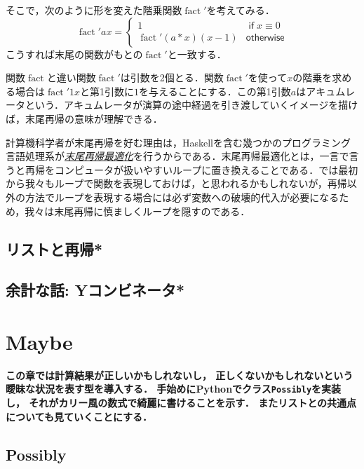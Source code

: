 \documentclass[a5paper,draft]{jsbook}
\newcommand{\programminglanguage}[1]{\textsf{#1}}
\newcommand{\haskell}{\programminglanguage{Haskell}}
\newcommand{\python}{\programminglanguage{Python}}
\newenvironment{leader}{\begingroup\bf}{\endgroup}
\newcommand{\keyword}[1]{{\underline{\emph{#1}}}}
\newcommand{\code}[1]{\texttt{#1}}
\newcommand{\mathSpecialFunction}[1]{\operatorname{\mathrm{#1}}}
\newcommand{\mathFactorial}{\mathSpecialFunction{fact}}
\newcommand{\mathKeyword}[1]{\operatorname{\textsf{#1}}}
\newcommand{\mathIf}{\mathKeyword{if}}
\newcommand{\mathOtherwise}{\mathKeyword{otherwise}}
\begin{document}
そこで，次のように形を変えた階乗関数$\mathFactorial'$を考えてみる．
\begin{equation}
\mathFactorial'ax=\begin{cases}
1&\mathIf x\equiv0\\
\mathFactorial'(a*x)(x-1)&\mathOtherwise
\end{cases}
\end{equation}
こうすれば末尾の関数がもとの$\mathFactorial'$と一致する．

関数$\mathFactorial$と違い関数$\mathFactorial'$は引数を2個とる．関数$\mathFactorial'$を使って$x$の階乗を求める場合は$\mathFactorial'1x$と第1引数に$1$を与えることにする．この第1引数$a$はアキュムレータという．アキュムレータが演算の途中経過を引き渡していくイメージを描けば，末尾再帰の意味が理解できる．

計算機科学者が末尾再帰を好む理由は，\haskell を含む幾つかのプログラミング言語処理系が\keyword{末尾再帰最適化}を行うからである．末尾再帰最適化とは，一言で言うと再帰をコンピュータが扱いやすいループに置き換えることである．では最初から我々もループで関数を表現しておけば，と思われるかもしれないが，再帰以外の方法でループを表現する場合には必ず変数への破壊的代入が必要になるため，我々は末尾再帰に慎ましくループを隠すのである．

\section{リストと再帰*}

\section{余計な話: Yコンビネータ*}


\chapter{Maybe}

\begin{leader}
この章では計算結果が正しいかもしれないし，
正しくないかもしれないという曖昧な状況を表す型を導入する．
手始めに\python でクラス\code{Possibly}を実装し，
それがカリー風の数式で綺麗に書けることを示す．
またリストとの共通点についても見ていくことにする．
\end{leader}

\section{Possibly}
\end{document}
